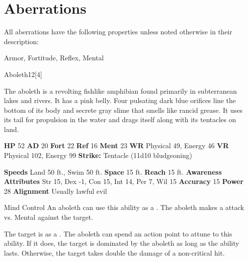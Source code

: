
        \section{Aberrations}

        All aberrations have the following properties unless noted otherwise in their description:
        
    
     Armor,
     Fortitude,
     Reflex,
     Mental
  
  
      
  \begin{monsection}{Aboleth}{12}[4]
    \vspace{-1em}\vspace{-1em}
    \vspace{0em}

    
    The aboleth is a revolting fishlike amphibian found primarily in subterranean lakes and rivers.
    It has a pink belly.
    Four pulsating dark blue orifices line the bottom of its body and secrete gray slime that smells like rancid grease.
    It uses its tail for propulsion in the water and drags itself along with its tentacles on land.
  
    

    \begin{spellcontent}
      \begin{spelltargetinginfo}
        \pari \textbf{HP} 52 \monsep
          \textbf{AD} 20 \monsep
          \textbf{Fort} 22 \monsep
          \textbf{Ref} 16 \monsep
          \textbf{Ment} 23
        \pari \textbf{WR} Physical 49, Energy 46 \monsep
        \textbf{VR} Physical 102, Energy 99
        \pari \textbf{Strike:}
            Tentacle  (11d10 bludgeoning)
      \end{spelltargetinginfo}
    \end{spellcontent}
    \begin{monsterfooter}
      \pari \textbf{Speeds} Land 50 ft., Swim 50 ft. \monsep
        \textbf{Space} 15 ft. \monsep
        \textbf{Reach} 15 ft.
      \pari \textbf{Awareness} 
      \pari \textbf{Attributes}
        Str 15, Dex -1,
        Con 15, Int 14,
        Per 7, Wil 15
      \pari \textbf{Accuracy} 15 \monsep
        \textbf{Power} 28
      \pari \textbf{Alignment} Usually lawful evil
    \end{monsterfooter}
  \end{monsection}
  \begin{freeability}{Mind Control}
      An aboleth can use this ability as a . The aboleth makes a  attack
        vs. Mental against the target.
    
    \hit The target is  as a .
    \crit 
        The aboleth can spend an action point to attune to this ability.
        If it does, the target is dominated by the aboleth as long as the ability lasts.
        Otherwise, the target takes double the damage of a non-critical hit.
    \end{freeability}
  

